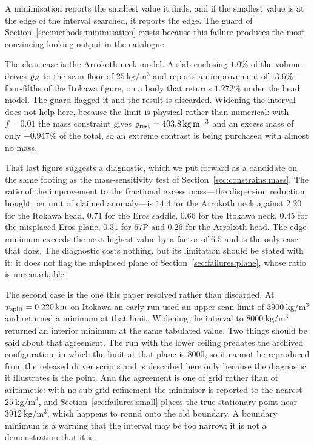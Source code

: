 A minimisation reports the smallest value it finds, and if the smallest
value is at the edge of the interval searched, it reports the edge. The
guard of Section~\ref{sec:methods:minimisation} exists because this
failure produces the most convincing-looking output in the catalogue.

The clear case is the Arrokoth neck model. A slab enclosing $1.0\%$ of the
volume drives $\varrho_{R}$ to the scan floor of
$\SI{25}{\kilo\gram\per\cubic\metre}$ and reports an improvement of
$13.6\%$---four-fifths of the Itokawa figure, on a body that returns
$1.272\%$ under the head model. The guard flagged it and the result is
discarded. Widening the interval does not help here, because the limit is
physical rather than numerical: with $f = 0.01$ the mass constraint gives
$\varrho_{\mathrm{rest}} = \SI{403.8}{\kilo\gram\per\cubic\metre}$ and an excess mass of
only $-0.947\%$ of the total, so an extreme contrast is being purchased
with almost no mass.

That last figure suggests a diagnostic, which we put forward as a
candidate on the same footing as the mass-sensitivity test of
Section~\ref{sec:constrains:mass}. The ratio of the improvement to the
fractional excess mass---the dispersion reduction bought per unit of
claimed anomaly---is $14.4$ for the Arrokoth neck against $2.20$ for the
Itokawa head, $0.71$ for the Eros saddle, $0.66$ for the Itokawa neck,
$0.45$ for the misplaced Eros plane, $0.31$ for 67P and $0.26$ for the
Arrokoth head. The edge minimum exceeds the next highest value by a factor
of $6.5$ and is the only case that does. The diagnostic costs nothing, but
its limitation should be stated with it: it does not flag the misplaced
plane of Section~\ref{sec:failures:plane}, whose ratio is unremarkable.

The second case is the one this paper resolved rather than discarded. At
$x_{\mathrm{split}} = \SI{0.220}{\kilo\metre}$ on Itokawa an early run used an upper
scan limit of $\SI{3900}{\kilo\gram\per\cubic\metre}$ and returned a
minimum at that limit. Widening the interval to
$\SI{8000}{\kilo\gram\per\cubic\metre}$ returned an interior minimum at
the same tabulated value. Two things should be said about that agreement.
The run with the lower ceiling predates the archived configuration, in
which the limit at that plane is $8000$, so it cannot be reproduced from
the released driver scripts and is described here only because the
diagnostic it illustrates is the point. And the agreement is one of grid
rather than of arithmetic: with no sub-grid refinement the minimiser is
reported to the nearest $\SI{25}{\kilo\gram\per\cubic\metre}$, and
Section~\ref{sec:failures:small} places the true stationary point near
$\SI{3912}{\kilo\gram\per\cubic\metre}$, which happens to round onto the
old boundary. A boundary minimum is a warning that the interval may be too
narrow; it is not a demonstration that it is.

